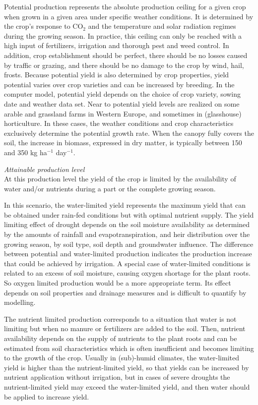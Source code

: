 Potential production represents the absolute production ceiling for a given crop when grown in 
a given area under specific weather conditions. It is determined by the crop’s response to CO$_{2}$ 
and the temperature and solar radiation regimes during the growing season. In practice, this 
ceiling can only be reached with a high input of fertilizers, irrigation and thorough pest and
weed control. In addition, crop establishment should be perfect, there should be no losses 
caused by traffic or grazing, and there should be no damage to the crop by wind, hail, frosts.
Because potential yield is also determined by crop properties, yield potential varies over
crop varieties and can be increased by breeding. In the computer model, potential yield 
depends on the choice of crop variety, sowing date and weather data set. Near to potential 
yield levels are realized on some arable and grassland farms in Western Europe, and 
sometimes in (glasshouse) horticulture. In these cases, the weather conditions and 
crop characteristics exclusively determine the potential growth rate. When the canopy 
fully covers the soil, the increase in biomass, expressed in dry matter, is typically 
between 150 and 350 kg ha$^{-1}$ day$^{-1}$.

{\it Attainable production level\/}\\
At this production level the yield of the crop is limited by the availability of water and/or nutrients 
during a part or the complete growing season. 

In this scenario, the water-limited yield represents the maximum yield that can be obtained under 
rain-fed conditions but with optimal nutrient supply. The yield limiting effect of drought depends on 
the soil moisture availability as determined by the amounts of rainfall and evapotranspiration, and 
heir distribution over the growing season, by soil type, soil depth and groundwater influence. The 
difference between potential and water-limited production indicates the production increase that 
could be achieved by irrigation. A special case of water-limited conditions is related to an excess 
of soil moisture, causing oxygen shortage for the plant roots. So oxygen limited production would be 
a more appropriate term. Its effect depends on soil properties and drainage measures and is difficult 
to quantify by modelling.

The nutrient limited production corresponds to a situation that water is not limiting but when no 
manure or fertilizers are added to the soil. Then, nutrient availability depends on the supply of 
nutrients to the plant roots and can be estimated from soil characteristics which is often insufficient 
and becomes limiting to the growth of the crop. Usually in (sub)-humid climates, the water-limited yield 
is higher than the nutrient-limited yield, so that yields can be increased by nutrient application without 
irrigation, but in cases of severe droughts the nutrient-limited yield may exceed the water-limited 
yield, and then water should be applied to increase yield.


